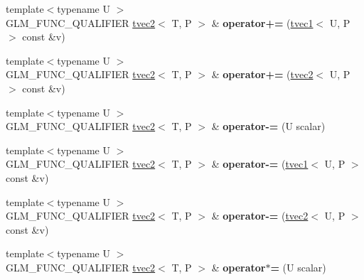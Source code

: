 \begin{DoxyCompactItemize}
{\footnotesize template$<$typename U $>$ }\\G\+L\+M\+\_\+\+F\+U\+N\+C\+\_\+\+Q\+U\+A\+L\+I\+F\+I\+ER \hyperlink{structglm_1_1tvec2}{tvec2}$<$ T, P $>$ \& {\bfseries operator+=} (\hyperlink{structglm_1_1tvec1}{tvec1}$<$ U, P $>$ const \&v)
\item 
\mbox{\label{structglm_1_1tvec2_aa986a740e1ba345aa71814bb2a08e597}} 
{\footnotesize template$<$typename U $>$ }\\G\+L\+M\+\_\+\+F\+U\+N\+C\+\_\+\+Q\+U\+A\+L\+I\+F\+I\+ER \hyperlink{structglm_1_1tvec2}{tvec2}$<$ T, P $>$ \& {\bfseries operator+=} (\hyperlink{structglm_1_1tvec2}{tvec2}$<$ U, P $>$ const \&v)
\item 
\mbox{\label{structglm_1_1tvec2_a11ccd30f5d8df13b15d2973eb4428a72}} 
{\footnotesize template$<$typename U $>$ }\\G\+L\+M\+\_\+\+F\+U\+N\+C\+\_\+\+Q\+U\+A\+L\+I\+F\+I\+ER \hyperlink{structglm_1_1tvec2}{tvec2}$<$ T, P $>$ \& {\bfseries operator-\/=} (U scalar)
\item 
\mbox{\label{structglm_1_1tvec2_a9a7beb6222ef80a7f3cf2e9931182445}} 
{\footnotesize template$<$typename U $>$ }\\G\+L\+M\+\_\+\+F\+U\+N\+C\+\_\+\+Q\+U\+A\+L\+I\+F\+I\+ER \hyperlink{structglm_1_1tvec2}{tvec2}$<$ T, P $>$ \& {\bfseries operator-\/=} (\hyperlink{structglm_1_1tvec1}{tvec1}$<$ U, P $>$ const \&v)
\item 
\mbox{\label{structglm_1_1tvec2_a77a58d01579458e0a09dcbd7a174592c}} 
{\footnotesize template$<$typename U $>$ }\\G\+L\+M\+\_\+\+F\+U\+N\+C\+\_\+\+Q\+U\+A\+L\+I\+F\+I\+ER \hyperlink{structglm_1_1tvec2}{tvec2}$<$ T, P $>$ \& {\bfseries operator-\/=} (\hyperlink{structglm_1_1tvec2}{tvec2}$<$ U, P $>$ const \&v)
\item 
\mbox{\label{structglm_1_1tvec2_a189c3954227d5907491766fb117af513}} 
{\footnotesize template$<$typename U $>$ }\\G\+L\+M\+\_\+\+F\+U\+N\+C\+\_\+\+Q\+U\+A\+L\+I\+F\+I\+ER \hyperlink{structglm_1_1tvec2}{tvec2}$<$ T, P $>$ \& {\bfseries operator$\ast$=} (U scalar)
\item 
\mbox{\label{structglm_1_1tvec2_aacddba2473d9bb1871b30b33dd214bec}} 

\end{DoxyCompactItemize}
